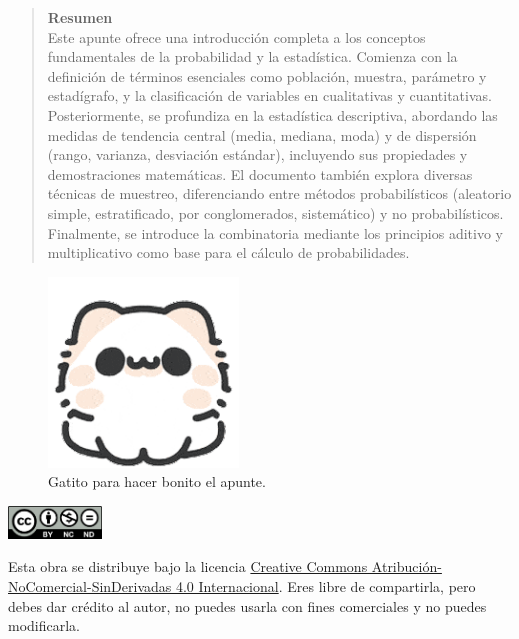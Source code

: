 \documentclass[12pt, letterpaper]{article}
\begin{document}
\newpage
\begin{abstract}
	\noindent \textbf{Resumen} \\
	Este apunte ofrece una introducción completa a los conceptos fundamentales de la probabilidad y la estadística. Comienza con la definición de términos esenciales como población, muestra, parámetro y estadígrafo, y la clasificación de variables en cualitativas y cuantitativas. Posteriormente, se profundiza en la estadística descriptiva, abordando las medidas de tendencia central (media, mediana, moda) y de dispersión (rango, varianza, desviación estándar), incluyendo sus propiedades y demostraciones matemáticas. El documento también explora diversas técnicas de muestreo, diferenciando entre métodos probabilísticos (aleatorio simple, estratificado, por conglomerados, sistemático) y no probabilísticos. Finalmente, se introduce la combinatoria mediante los principios aditivo y multiplicativo como base para el cálculo de probabilidades.
\end{abstract}

\begin{figure}[htbp]
	\centering
	\includegraphics[width=0.45\textwidth]{gatito}
	\caption{Gatito para hacer bonito el apunte.}
	\label{fig:gatito}
\end{figure}

\vfill %

\begin{center}
	\includegraphics[width=2.5cm]{by-nc-nd} %
	\vspace{0.2cm} %
	\parbox{0.8\textwidth}{\footnotesize \centering Esta obra se distribuye bajo la licencia \href{https://creativecommons.org/licenses/by-nc-nd/4.0/deed.es}{Creative Commons Atribución-NoComercial-SinDerivadas 4.0 Internacional}. Eres libre de compartirla, pero debes dar crédito al autor, no puedes usarla con fines comerciales y no puedes modificarla.}
\end{center}
\end{document}
